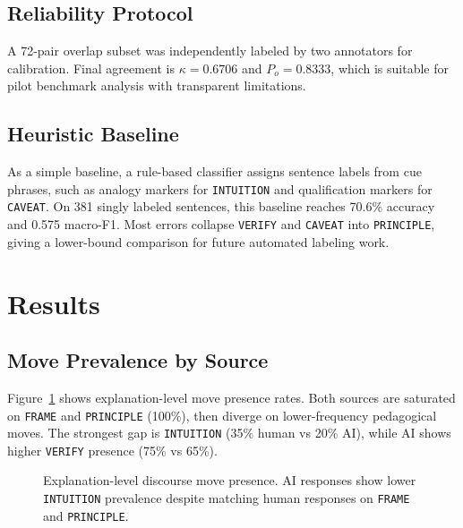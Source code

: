 \documentclass{article}
\begin{document}
\subsection{Reliability Protocol}
A 72-pair overlap subset was independently labeled by two annotators for calibration. Final agreement is $\kappa=0.6706$ and $P_o=0.8333$, which is suitable for pilot benchmark analysis with transparent limitations.

\subsection{Heuristic Baseline}
As a simple baseline, a rule-based classifier assigns sentence labels from cue phrases, such as analogy markers for \texttt{INTUITION} and qualification markers for \texttt{CAVEAT}. On 381 singly labeled sentences, this baseline reaches 70.6\% accuracy and 0.575 macro-F1. Most errors collapse \texttt{VERIFY} and \texttt{CAVEAT} into \texttt{PRINCIPLE}, giving a lower-bound comparison for future automated labeling work.

\section{Results}
\subsection{Move Prevalence by Source}
Figure~\ref{fig:move-presence} shows explanation-level move presence rates. Both sources are saturated on \texttt{FRAME} and \texttt{PRINCIPLE} (100\%), then diverge on lower-frequency pedagogical moves. The strongest gap is \texttt{INTUITION} (35\% human vs 20\% AI), while AI shows higher \texttt{VERIFY} presence (75\% vs 65\%).

\begin{figure}[t]
\centering
{}
\caption{Explanation-level discourse move presence. AI responses show lower \texttt{INTUITION} prevalence despite matching human responses on \texttt{FRAME} and \texttt{PRINCIPLE}.}
\label{fig:move-presence}
\vspace{-0.9em}
\end{figure}
\end{document}
